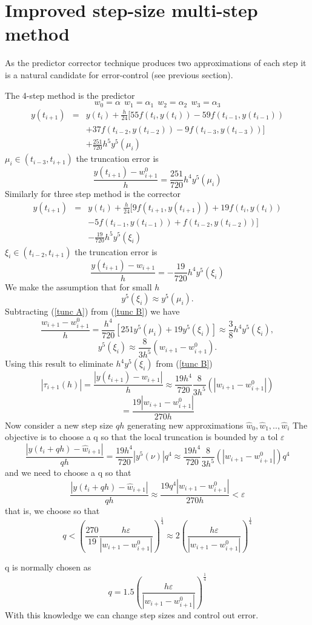 \section{Improved step-size multi-step method}
As the predictor corrector technique produces two approximations of each step 
it is a natural candidate for error-control (see previous section).
\begin{example}
The  4-step method is the predictor
\[ w_0=\alpha \ \ w_1=\alpha_1 \ \ w_2 = \alpha_2 \ \ w_3=\alpha_3 \]
\begin{eqnarray*}
y(t_{i+1}) &=& y(t_{i})+\frac{h}{24}[55f(t_i,y(t_i)) -59 f(t_{i-1},y(t_{i-1}))\\ 
& & +37f(t_{i-2},y(t_{i-2})) -9 f(t_{i-3},y(t_{i-3}))]\\
& & + \frac{251}{720}h^5 y^5(\mu_i) \end{eqnarray*}
$\mu_i \in (t_{i-3},t_{i+1})$
the truncation error is
\begin{equation}
\label{tunc A}
\frac{y(t_{i+1})-w_{i+1}^0}{h}=\frac{251}{720}h^4 y^5(\mu_i)
\end{equation}
Similarly for  three step method is the corrector
\begin{eqnarray*} y(t_{i+1}) &=& y(t_{i})+\frac{h}{24}[9f(t_{i+1},y(t_{i+1})) +19 f(t_{i},y(t_{i}))\\
& & -5f(t_{i-1},y(t_{i-1})) + f(t_{i-2},y(t_{i-2}))]\\ 
& &-\frac{19}{720}h^5 y^5(\xi_i) \end{eqnarray*}
$\xi_i \in (t_{i-2},t_{i+1})$
the truncation error is
\begin{equation}
\label{tunc B}
\frac{y(t_{i+1})-w_{i+1}}{h}=-\frac{19}{720}h^4 y^5(\xi_i)
\end{equation}
We make the assumption that for small $h$
\[y^5(\xi_i) \approx y^5(\mu_i).\]
Subtracting (\ref{tunc A}) from (\ref{tunc B}) we have
\[\frac{w_{i+1}-w_{i+1}^0}{h}=\frac{h^4}{720}[251y^5(\mu_i)+19y^5(\xi_i)]\approx
\frac{3}{8}h^4y^5(\xi_i), \]
\begin{equation}
y^5(\xi_i) \approx \frac{8}{3h^5}(w_{i+1}-w_{i+1}^0).
\end{equation}
Using this result to eliminate $h^4y^5(\xi_i)$ from (\ref{tunc B})
\[
|\tau_{i+1}(h)| = \frac{|y(t_{i+1})-w_{i+1}|}{h}\approx\frac{19h^4}{720}\frac{8}{3h^5}(|w_{i+1}-w_{i+1}^0|)\]
\[ =\frac{19|w_{i+1}-w_{i+1}^0|}{270h}\]
Now consider a new step size $qh$ generating new approximations $\hat{w}_0,\hat{w}_1,..,\hat{w}_i$
The objective is to choose a q so that the local truncation is bounded by a tol
$\varepsilon$
\[
\frac{|y(t_{i}+qh)-\hat{w}_{i+1}|}{qh}=\frac{19h^4}{720}|y^5(\nu)|q^4\approx\frac{19h^4}{720}\frac{8}{3h^5}(|w_{i+1}-w_{i+1}^0|)q^4
\]
and we need to choose a q so that
\[\frac{|y(t_{i}+qh)-\hat{w}_{i+1}|}{qh}\approx\frac{19q^4|w_{i+1}-w_{i+1}^0|}{270h} < \varepsilon \]
that is, we choose so that
\[ q < \left( \frac{270}{19}\frac{h\varepsilon}{|w_{i+1}-w_{i+1}^0|}\right)^{\frac{1}{4}}\approx 2\left( \frac{h\varepsilon}{|w_{i+1}-w_{i+1}^0|}\right)^{\frac{1}{4}}\]
\end{example}
q is normally chosen as 
\[ q = 1.5\left( \frac{h\varepsilon}{|w_{i+1}-w_{i+1}^0|}\right)^{\frac{1}{4}}\]
With this knowledge we can change step sizes and control out error.

